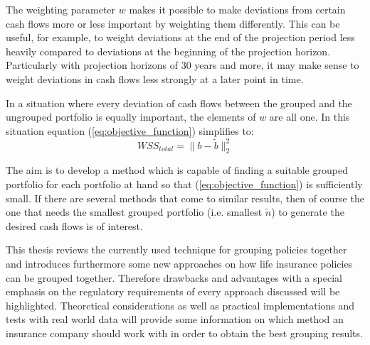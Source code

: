 The weighting parameter $w$ makes it possible to make deviations from certain cash flows more or less important by weighting them differently. This can be useful, for example, to weight deviations at the end of the projection period less heavily compared to deviations at the beginning of the projection horizon. Particularly with projection horizons of 30 years and more, it may make sense to weight deviations in cash flows less strongly at a later point in time. 

\begin{remark}
	In a situation where every deviation of cash flows between the grouped and the ungrouped portfolio is equally important, the elements of $w$ are all one. In this situation equation (\ref{eq:objective_function}) simplifies to:	
	\begin{equation}\label{eq:objective_function_simple}
		WSS_{total} = \lVert b - \tilde{b}\lVert_2^2
	\end{equation}	
\end{remark}

The aim is to develop a method which is capable of finding a suitable grouped portfolio for each portfolio at hand so that (\ref{eq:objective_function}) is sufficiently small. If there are several methods that come to similar results, then of course the one that needs the smallest grouped portfolio (i.e. smallest $\tilde{n}$) to generate the desired cash flows is of interest. 


This thesis reviews the currently used technique for grouping policies together and introduces furthermore some new approaches on how life insurance policies can be grouped together. Therefore drawbacks and advantages with a special emphasis on the regulatory requirements of every approach discussed will be highlighted. Theoretical considerations as well as practical implementations and tests with real world data will provide some information on which method an insurance company should work with in order to obtain the best grouping results.  

